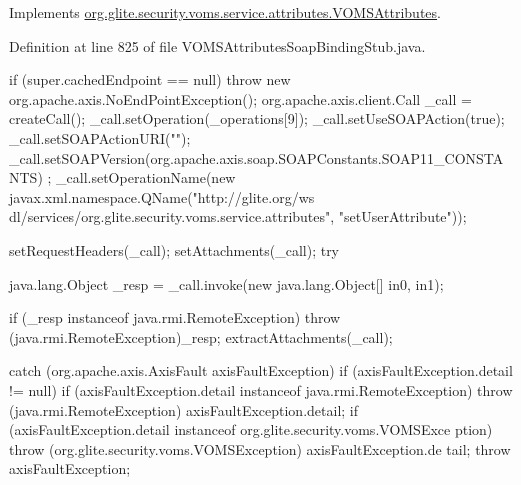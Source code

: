 Implements \hyperlink{interfaceorg_1_1glite_1_1security_1_1voms_1_1service_1_1attributes_1_1VOMSAttributes_a755b5d37541db7a0c0bdbe33b2e850ec}{org.glite.security.voms.service.attributes.VOMSAttributes}.



Definition at line 825 of file VOMSAttributesSoapBindingStub.java.


\begin{DoxyCode}
                                                                                 
                                                                                       
                                             {
        if (super.cachedEndpoint == null) {
            throw new org.apache.axis.NoEndPointException();
        }
        org.apache.axis.client.Call _call = createCall();
        _call.setOperation(_operations[9]);
        _call.setUseSOAPAction(true);
        _call.setSOAPActionURI("");
        _call.setSOAPVersion(org.apache.axis.soap.SOAPConstants.SOAP11_CONSTANTS)
      ;
        _call.setOperationName(new javax.xml.namespace.QName("http://glite.org/ws
      dl/services/org.glite.security.voms.service.attributes", "setUserAttribute"));

        setRequestHeaders(_call);
        setAttachments(_call);
 try {        java.lang.Object _resp = _call.invoke(new java.lang.Object[] {in0, 
      in1});

        if (_resp instanceof java.rmi.RemoteException) {
            throw (java.rmi.RemoteException)_resp;
        }
        extractAttachments(_call);
  } catch (org.apache.axis.AxisFault axisFaultException) {
    if (axisFaultException.detail != null) {
        if (axisFaultException.detail instanceof java.rmi.RemoteException) {
              throw (java.rmi.RemoteException) axisFaultException.detail;
         }
        if (axisFaultException.detail instanceof org.glite.security.voms.VOMSExce
      ption) {
              throw (org.glite.security.voms.VOMSException) axisFaultException.de
      tail;
         }
   }
  throw axisFaultException;
}
    }
\end{DoxyCode}


